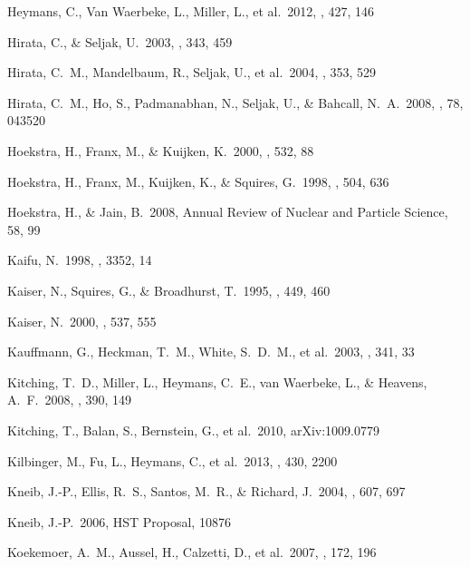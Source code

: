 \documentclass[apj]{emulateapj}
\begin{document}
\begin{thebibliography}{}
  Heymans, C., Van
  Waerbeke, L., Miller, L., et al.\ 2012, \mnras, 427, 146

  Hirata, C., \& Seljak, U.\ 2003, \mnras, 343, 459
  
  Hirata, C.~M., 
Mandelbaum, R., Seljak, U., et al.\ 2004, \mnras, 353, 529 

  Hirata, C.~M., Ho, S.,
  Padmanabhan, N., Seljak, U., \& Bahcall, N.~A.\ 2008, \prd, 78, 043520

  Hoekstra, H., Franx,
M., \& Kuijken, K.\ 2000, \apj, 532, 88

  Hoekstra, H., Franx,
  M., Kuijken, K., \& Squires, G.\ 1998, \apj, 504, 636

  Hoekstra, H.,
  \& Jain, B.\ 2008, Annual Review of Nuclear and Particle Science, 58, 99

  Kaifu, N.\ 1998, \procspie,
  3352, 14

  Kaiser, N., Squires, G.,
   \& Broadhurst, T.\ 1995, \apj, 449, 460

   Kaiser, N.\ 2000, \apj, 537,
555

 Kauffmann, G.,
Heckman, T.~M., White, S.~D.~M., et al.\ 2003, \mnras, 341, 33

  Kitching, T.~D.,
  Miller, L., Heymans, C.~E., van Waerbeke, L.,
  \& Heavens, A.~F.\ 2008, \mnras, 390, 149

  Kitching, T., Balan,
S., Bernstein, G., et al.\ 2010, arXiv:1009.0779

  Kilbinger, M., Fu,
  L., Heymans, C., et al.\ 2013, \mnras, 430, 2200

  Kneib, J.-P., Ellis,
  R.~S., Santos, M.~R., \& Richard, J.\ 2004, \apj, 607, 697

  Kneib, J.-P.\ 2006, HST
  Proposal, 10876

 Koekemoer, A.~M.,
Aussel, H., Calzetti, D., et al.\ 2007, \apjs, 172, 196


\end{thebibliography}
\end{document}
